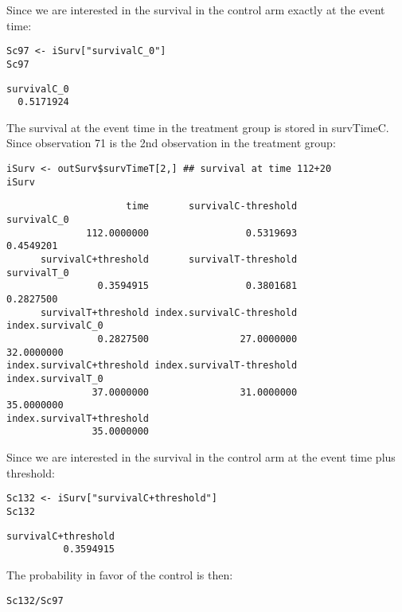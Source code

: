 \documentclass[12pt]{article}
\begin{document}
Since we are interested in the survival in the control arm exactly at the event time:
\lstset{language=r,label= ,caption= ,captionpos=b,numbers=none}
\begin{lstlisting}
Sc97 <- iSurv["survivalC_0"] 
Sc97
\end{lstlisting}

\begin{verbatim}
survivalC_0 
  0.5171924
\end{verbatim}

The survival at the event time in the treatment group is stored in
survTimeC. Since observation 71 is the 2nd observation in the treatment
group:
\lstset{language=r,label= ,caption= ,captionpos=b,numbers=none}
\begin{lstlisting}
iSurv <- outSurv$survTimeT[2,] ## survival at time 112+20
iSurv
\end{lstlisting}

\begin{verbatim}
                     time       survivalC-threshold               survivalC_0 
              112.0000000                 0.5319693                 0.4549201 
      survivalC+threshold       survivalT-threshold               survivalT_0 
                0.3594915                 0.3801681                 0.2827500 
      survivalT+threshold index.survivalC-threshold         index.survivalC_0 
                0.2827500                27.0000000                32.0000000 
index.survivalC+threshold index.survivalT-threshold         index.survivalT_0 
               37.0000000                31.0000000                35.0000000 
index.survivalT+threshold 
               35.0000000
\end{verbatim}

Since we are interested in the survival in the control arm at the event time plus threshold:
\lstset{language=r,label= ,caption= ,captionpos=b,numbers=none}
\begin{lstlisting}
Sc132 <- iSurv["survivalC+threshold"] 
Sc132
\end{lstlisting}

\begin{verbatim}
survivalC+threshold 
          0.3594915
\end{verbatim}

The probability in favor of the control is then:
\lstset{language=r,label= ,caption= ,captionpos=b,numbers=none}
\begin{lstlisting}
Sc132/Sc97
\end{lstlisting}
\end{document}
